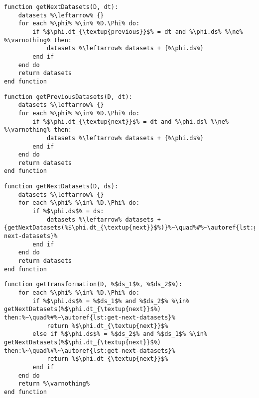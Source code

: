 \begin{lstlisting}[language=pseudocode,label={lst:get-next-datasets},caption={[Obtenção dos próximos conjuntos de dados de uma transformação]Obtenção dos próximos conjuntos de dados de uma transformação de dados.}]
function getNextDatasets(D, dt):
    datasets %\leftarrow% {}
    for each %\phi% %\in% %D.\Phi% do:
        if %$\phi.dt_{\textup{previous}}$% = dt and %\phi.ds% %\ne% %\varnothing% then:
            datasets %\leftarrow% datasets + {%\phi.ds%}
        end if
    end do
    return datasets
end function
\end{lstlisting}

\begin{lstlisting}[language=pseudocode,label={lst:get-previous-datasets},caption={[Obtenção dos conjuntos de dados anteriores a uma transformação]Obtenção dos conjuntos de dados anteriores a uma transformação de dados.}]
function getPreviousDatasets(D, dt):
    datasets %\leftarrow% {}
    for each %\phi% %\in% %D.\Phi% do:
        if %$\phi.dt_{\textup{next}}$% = dt and %\phi.ds% %\ne% %\varnothing% then:
            datasets %\leftarrow% datasets + {%\phi.ds%}
        end if
    end do
    return datasets
end function
\end{lstlisting}

\begin{lstlisting}[language=pseudocode,label={lst:get-next-datasets-2},caption={[Obtenção dos próximos conjuntos de dados de um conjunto de dados]Obtenção dos próximos conjuntos de dados de um conjunto de dados.}]
function getNextDatasets(D, ds):
    datasets %\leftarrow% {}
    for each %\phi% %\in% %D.\Phi% do:
        if %$\phi.ds$% = ds:
            datasets %\leftarrow% datasets + {getNextDatasets(%$\phi.dt_{\textup{next}}$%)}%~\quad%#%~\autoref{lst:get-next-datasets}%
        end if
    end do
    return datasets
end function
\end{lstlisting}

\begin{lstlisting}[language=pseudocode,label={lst:get-transformation},caption={[Obtenção da transformação entre dois conjuntos de dados]Obtenção da transformação de dados associada a dois conjuntos de dados.}]
function getTransformation(D, %$ds_1$%, %$ds_2$%):
    for each %\phi% %\in% %D.\Phi% do:
        if %$\phi.ds$% = %$ds_1$% and %$ds_2$% %\in% getNextDatasets(%$\phi.dt_{\textup{next}}$%) then:%~\quad%#%~\autoref{lst:get-next-datasets}%
            return %$\phi.dt_{\textup{next}}$%
        else if %$\phi.ds$% = %$ds_2$% and %$ds_1$% %\in% getNextDatasets(%$\phi.dt_{\textup{next}}$%) then:%~\quad%#%~\autoref{lst:get-next-datasets}%
            return %$\phi.dt_{\textup{next}}$%
        end if
    end do
    return %\varnothing%
end function
\end{lstlisting}